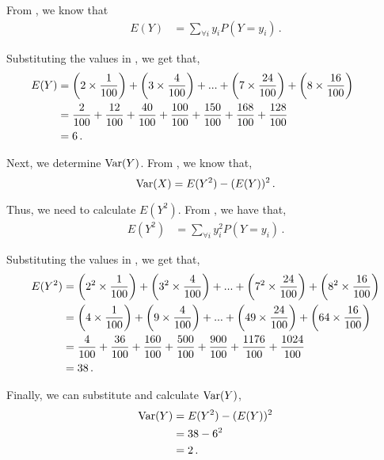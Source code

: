 \begin{subquestions}
\begin{subsubquestions}

\subsubquestion

From , we know that
\begin{align}
	E(Y)  & = \sum_{\forall i} y_i  P(Y=y_i) \,.
\end{align}

Substituting the values in , we get that,
\begin{align} \hspace{-70pt}
	E(Y)  & = \left(2 \times \frac{1}{100}\right) + \left(3 \times \frac{4}{100}\right) + ... +  \left(7 \times \frac{24}{100}\right) + \left(8 \times \frac{16}{100}\right) \nn \\
	      & = \frac{2}{100}+ \frac{12}{100}+ \frac{40}{100}+ \frac{100}{100}+ \frac{150}{100}+ \frac{168}{100}+ \frac{128}{100} \nn \\
	      & = 6 \,.
\end{align}

Next, we determine $\text{Var}(Y)$. From , we know that,
\begin{equation}
	\text{Var}(X) = E(Y^2) - (E(Y))^2 \,. \label{2008J:q4:Var}
\end{equation}

Thus, we need to calculate $E(Y^2)$. From , we have that,
\begin{align}
	E(Y^2) & = \sum_{\forall i} y_i^2  P(Y=y_i) \,.
\end{align}

Substituting the values in , we get that,
\begin{align}
	E(Y^2) & = \left(2^2 \times \frac{1}{100}\right) + \left(3^2 \times \frac{4}{100}\right) + ... +  \left(7^2 \times \frac{24}{100}\right) + \left(8^2 \times \frac{16}{100}\right) \nonumber \\
		   & = \left(4 \times \frac{1}{100}\right) + \left(9 \times \frac{4}{100}\right) + ... +  \left(49 \times \frac{24}{100}\right) + \left(64 \times \frac{16}{100}\right) \nonumber \\
		   &= \frac{4}{100}+\frac{36}{100}+\frac{160}{100}+\frac{500}{100}+\frac{900}{100}+\frac{1176}{100}+\frac{1024}{100} \nonumber \\
		   & = 38 \,.
\end{align}

Finally, we can substitute and calculate $\text{Var}(Y)$,
\begin{align}
	\text{Var}(Y) & = E(Y^2) - (E(Y))^2  \nonumber \\
	           & = 38 - 6^2 \nonumber \\
	           & = 2 \,.
\end{align}


\end{subsubquestions}
\end{subquestions}
